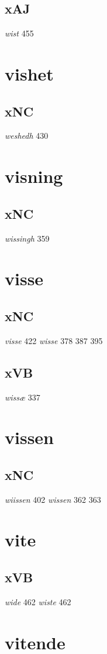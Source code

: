 \documentclass[a4paper,twocolumn]{article}
\begin{document}
\subsection{xAJ}
\label{sec:org5a20319}
\emph{wist} 455 
\section{vishet}
\label{sec:orgff06e4f}
\subsection{xNC}
\label{sec:org4dc025e}
\emph{weshedh} 430 
\section{visning}
\label{sec:orge9ea236}
\subsection{xNC}
\label{sec:org59ded81}
\emph{wissingh} 359 
\section{visse}
\label{sec:org2f19eea}
\subsection{xNC}
\label{sec:org4790d51}
\emph{visse} 422 \emph{wisse} 378 387 395 
\subsection{xVB}
\label{sec:org64d8873}
\emph{wissæ} 337 
\section{vissen}
\label{sec:org7d7156b}
\subsection{xNC}
\label{sec:org7ccb067}
\emph{wiissen} 402 \emph{wissen} 362 363 
\section{vite}
\label{sec:orgf77edc9}
\subsection{xVB}
\label{sec:orge11dbaa}
\emph{wide} 462 \emph{wiste} 462 
\section{vitende}
\label{sec:org8d79240}
\end{document}
